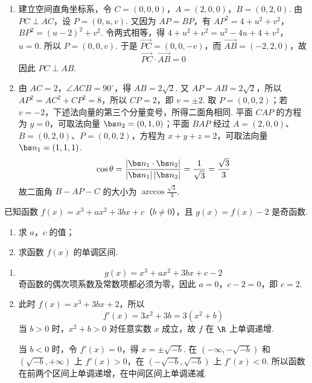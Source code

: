 \begin{solution}
\begin{enumerate}
\item 建立空间直角坐标系，令 \(C=(0,0,0)\)，\(A=(2,0,0)\)，\(B=(0,2,0)\).
由 \(PC\perp AC\)，设 \(P=(0,u,v)\). 又因为 \(AP=BP\)，有
\(AP^2=4+u^2+v^2\)，\(BP^2=(u-2)^2+v^2\).
令两式相等，得
\(4+u^2+v^2=u^2-4u+4+v^2\)，\(u=0\).
所以 \(P=(0,0,v)\). 于是 \(\overrightarrow{PC}=(0,0,-v)\)，而
\(\overrightarrow{AB}=(-2,2,0)\)，故
\[
\overrightarrow{PC}\cdot\overrightarrow{AB}=0
\]
因此 \(PC\perp AB\).
\item 由 \(AC=2\)，\(\angle ACB=90^\circ\)，得 \(AB=2\sqrt2\). 又 \(AP=AB=2\sqrt2\)，所以
\(AP^2=AC^2+CP^2=8\)，所以 \(CP=2\)，即 \(v=\pm2\). 取 \(P=(0,0,2)\)；若 \(v=-2\)，下述法向量的第三个分量变号，所得二面角相同. 平面 \(CAP\) 的方程为 \(y=0\)，可取法向量 \(\bs n_2=(0,1,0)\)；平面 \(BAP\) 经过 \(A=(2,0,0)\)、\(B=(0,2,0)\)、\(P=(0,0,2)\)，方程为 \(x+y+z=2\)，可取法向量 \(\bs n_1=(1,1,1)\).
\[
\cos\theta=\frac{|\bs n_1\cdot\bs n_2|}{|\bs n_1|\,|\bs n_2|}=\frac1{\sqrt3}=\frac{\sqrt3}{3}
\]
故二面角 \(B-AP-C\) 的大小为
\(\displaystyle\arccos\frac{\sqrt3}{3}\).
\end{enumerate}
\end{solution}

\begin{problem}
已知函数 \( f(x) = x^3 + ax^2 + 3bx + c \)（\(b \neq 0\)），且 \( g(x) = f(x) - 2 \) 是奇函数.

\begin{enumerate}
\item 求 \(a\)，\(c\) 的值；
\item 求函数 \( f(x) \) 的单调区间.
\end{enumerate}
\end{problem}

\begin{solution}
\begin{enumerate}
\item
\[
g(x)=x^3+ax^2+3bx+c-2
\]
奇函数的偶次项系数及常数项都必须为零，因此 \(a=0\)，\(c-2=0\)，即 \(c=2\).
\item 此时 \(f(x)=x^3+3bx+2\)，所以
\[
f'(x)=3x^2+3b=3(x^2+b)
\]
当 \(b>0\) 时，\(x^2+b>0\) 对任意实数 \(x\) 成立，故 \(f\) 在 \(\R\) 上单调递增.

当 \(b<0\) 时，令 \(f'(x)=0\)，得 \(x=\pm\sqrt{-b}\). 在
\(\left(-\infty,-\sqrt{-b}\right)\) 和 \(\left(\sqrt{-b},+\infty\right)\) 上 \(f'(x)>0\)，在
\(\left(-\sqrt{-b},\sqrt{-b}\right)\) 上 \(f'(x)<0\). 所以函数在前两个区间上单调递增，在中间区间上单调递减.
\end{enumerate}
\end{solution}

